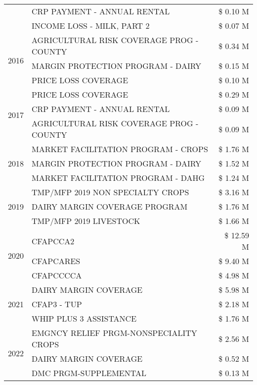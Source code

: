 \begin{tabular}{llr}
 & CRP PAYMENT - ANNUAL RENTAL & \$ 0.10 M \\
 & INCOME LOSS - MILK, PART 2 & \$ 0.07 M \\
\cline{1-3}
\multirow[t]{3}{*}{2016} & AGRICULTURAL RISK COVERAGE PROG - COUNTY & \$ 0.34 M \\
 & MARGIN PROTECTION PROGRAM - DAIRY & \$ 0.15 M \\
 & PRICE LOSS COVERAGE & \$ 0.10 M \\
\cline{1-3}
\multirow[t]{3}{*}{2017} & PRICE LOSS COVERAGE & \$ 0.29 M \\
 & CRP PAYMENT - ANNUAL RENTAL & \$ 0.09 M \\
 & AGRICULTURAL RISK COVERAGE PROG - COUNTY & \$ 0.09 M \\
\cline{1-3}
\multirow[t]{3}{*}{2018} & MARKET FACILITATION PROGRAM - CROPS & \$ 1.76 M \\
 & MARGIN PROTECTION PROGRAM - DAIRY & \$ 1.52 M \\
 & MARKET FACILITATION PROGRAM - DAHG & \$ 1.24 M \\
\cline{1-3}
\multirow[t]{3}{*}{2019} & TMP/MFP 2019 NON SPECIALTY CROPS & \$ 3.16 M \\
 & DAIRY MARGIN COVERAGE PROGRAM & \$ 1.76 M \\
 & TMP/MFP 2019 LIVESTOCK & \$ 1.66 M \\
\cline{1-3}
\multirow[t]{3}{*}{2020} & CFAPCCA2 & \$ 12.59 M \\
 & CFAPCARES & \$ 9.40 M \\
 & CFAPCCCCA & \$ 4.98 M \\
\cline{1-3}
\multirow[t]{3}{*}{2021} & DAIRY MARGIN COVERAGE & \$ 5.98 M \\
 & CFAP3 - TUP & \$ 2.18 M \\
 & WHIP PLUS 3 ASSISTANCE & \$ 1.76 M \\
\cline{1-3}
\multirow[t]{3}{*}{2022} & EMGNCY RELIEF PRGM-NONSPECIALITY CROPS & \$ 2.56 M \\
 & DAIRY MARGIN COVERAGE & \$ 0.52 M \\
 & DMC PRGM-SUPPLEMENTAL & \$ 0.13 M \\
\cline{1-3}
\bottomrule
\end{tabular}
